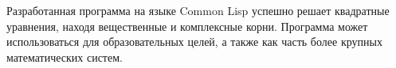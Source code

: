 

Разработанная программа на языке Common Lisp успешно решает квадратные уравнения, 
находя вещественные и комплексные корни. Программа может использоваться для 
образовательных целей, а также как часть более крупных математических систем.